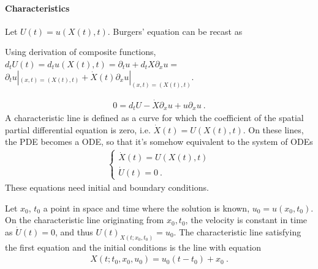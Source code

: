 \documentclass[letterpaper,10pt,english]{jupyterBook}
\begin{document}
\paragraph{Characteristics}
\label{\detokenize{ch/pde/hyperbolic-1d-scalar-nonlinear:characteristics}}\label{\detokenize{ch/pde/hyperbolic-1d-scalar-nonlinear:pde-hyperbolic-problems-scalar-nonlinear-examples-burgers-characteristics}}
\sphinxAtStartPar
Let \(U(t) = u(X(t), t)\). Burgers’ equation can be recast as%
\begin{footnote}[2]\sphinxAtStartFootnote
Using derivation of composite functions, \(d_t U(t) = d_t u(X(t), t) = \partial_t u + d_t X \partial_x u =\) \( \partial_t u|_{(x,t)=(X(t),t)} + \dot{X}(t) \partial_x u|_{(x,t)=(X(t),t)}\).
%
\end{footnote}
\begin{equation*}
\begin{split}0 = d_t U - \dot{X} \partial_x u + u \partial_x u \ .\end{split}
\end{equation*}
\sphinxAtStartPar
A characteristic line is defined as a curve for which the coefficient of the spatial partial differential equation is zero, i.e. \(\dot{X}(t) = U(X(t),t)\). On these lines, the PDE becomes a ODE, so that it’s somehow equivalent   to the system of ODEs
\begin{equation*}
\begin{split}\begin{cases}
  \dot{X}(t) = U(X(t), t) \\
  \dot{U}(t) = 0 \ .
\end{cases}\end{split}
\end{equation*}
\sphinxAtStartPar
These equations need initial and boundary conditions.

\sphinxAtStartPar
{} 

\sphinxAtStartPar
Let \(x_0\), \(t_0\) a point in space and time where the solution is known, \(u_0 = u(x_0, t_0)\). On the characteristic line originating from \(x_0, t_0\), the velocity is constant in time as \(\dot{U}(t) = 0\), and thus \(U(t)_{X(t;x_0,t_0)} = u_0\). The characteristic line satisfying the first equation and the initial conditions is the line with equation
\begin{equation*}
\begin{split}X(t; t_0,x_0, u_0) = u_0 ( t - t_0 ) + x_0 \ .\end{split}
\end{equation*}
\end{document}
